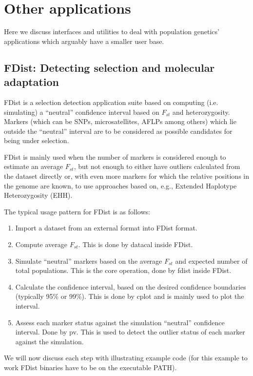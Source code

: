 \documentclass{report}
\begin{document}
\section{Other applications}

Here we discuss interfaces and utilities to deal with population genetics'
applications which arguably have a smaller user base.

\subsection{FDist: Detecting selection and molecular adaptation}

FDist is a selection detection application suite based on computing
(i.e. simulating) a ``neutral'' confidence interval based on $F_{st}$ and
heterozygosity. Markers (which can be SNPs, microsatellites, AFLPs
among others) which lie outside the ``neutral'' interval are to be
considered as possible candidates for being under selection.

FDist is mainly used when the number of markers is considered enough
to estimate an average $F_{st}$, but not enough to either have outliers
calculated from the dataset directly or, with even more markers for
which the relative positions in the genome are known, to use
approaches based on, e.g., Extended Haplotype Heterozygosity (EHH).

The typical usage pattern for FDist is as follows:

\begin{enumerate}
\item Import a dataset from an external format into FDist format.
\item Compute average $F_{st}$. This is done by datacal inside FDist.
\item Simulate ``neutral'' markers based on the
    average $F_{st}$ and expected number of total populations.
    This is the core operation, done by fdist inside FDist.
\item Calculate the confidence interval, based on the desired
    confidence boundaries (typically 95\% or 99\%). This is done by
    cplot and is mainly used to plot the interval.
\item Assess each marker status against the simulation ``neutral''
    confidence interval. Done
    by pv. This is used to detect the outlier status of each marker
    against the simulation.
\end{enumerate}

We will now discuss each step with illustrating example code
(for this example to work FDist binaries have to be on the
executable PATH).
\end{document}
